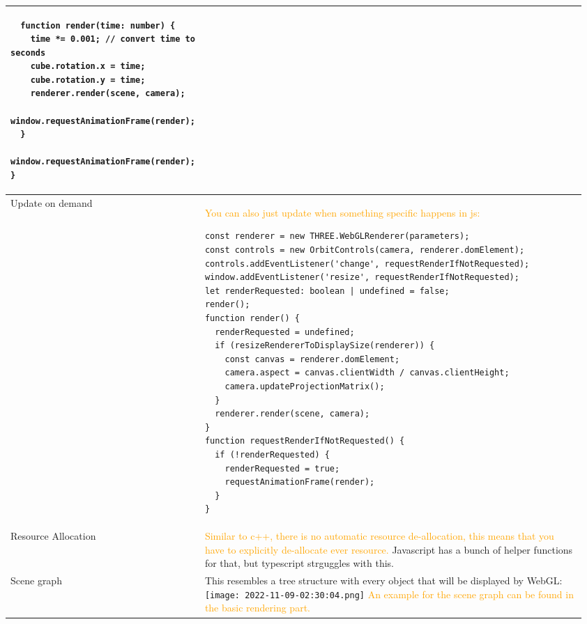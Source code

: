 \documentclass[main.tex,fontsize=8pt,paper=a4,paper=portrait,DIV=calc,]{scrartcl}
\begin{document}
\begin{table}[ht!]
\begin{tabular}{|m{0.2\linewidth}|m{0.755\linewidth}|}
\begin{lstlisting}
  function render(time: number) {
    time *= 0.001; // convert time to seconds
    cube.rotation.x = time;
    cube.rotation.y = time;
    renderer.render(scene, camera);
    window.requestAnimationFrame(render);
  }
  window.requestAnimationFrame(render);
}
\end{lstlisting}\\
\hline
Update on demand & 
\textcolor{orange}{You can also just update when something specific happens in js:}\newline
\begin{lstlisting}
const renderer = new THREE.WebGLRenderer(parameters);
const controls = new OrbitControls(camera, renderer.domElement);
controls.addEventListener('change', requestRenderIfNotRequested);
window.addEventListener('resize', requestRenderIfNotRequested);
let renderRequested: boolean | undefined = false;
render();
function render() {
  renderRequested = undefined;
  if (resizeRendererToDisplaySize(renderer)) {
    const canvas = renderer.domElement;
    camera.aspect = canvas.clientWidth / canvas.clientHeight;
    camera.updateProjectionMatrix();
  }
  renderer.render(scene, camera);
}
function requestRenderIfNotRequested() {
  if (!renderRequested) {
    renderRequested = true;
    requestAnimationFrame(render);
  }
}
\end{lstlisting}\\
\hline
Resource Allocation & 
\textcolor{orange}{Similar to c++, there is no automatic resource de-allocation, this means that you have to explicitly de-allocate ever resource.}\newline 
Javascript has a bunch of helper functions for that, but typescript strguggles with this.\\
\hline
Scene graph & 
This resembles a tree structure with every object that will be displayed by WebGL:\newline
\texttt{[image: 2022-11-09-02:30:04.png]}\newline
\textcolor{orange}{An example for the scene graph can be found in the basic rendering part.}\\
\hline
\end{tabular}
\end{table}
\pagebreak
\end{document}
